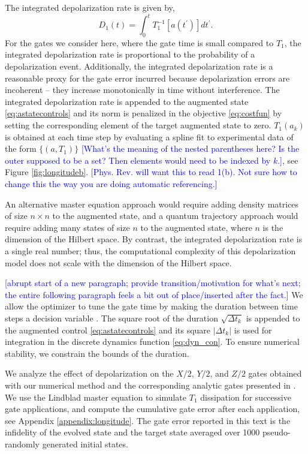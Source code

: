 The integrated depolarization rate is given by,
\begin{equation}
  D_{1}(t) = \int_{0}^{t} T_{1}^{-1}[a(t^{\prime})] dt^{\prime}.
\end{equation}
For the gates we consider here, where the gate time is small compared to $T_{1}$,
the integrated depolarization rate is proportional to the probability of a depolarization event.
Additionally, the integrated depolarization rate is a reasonable proxy for the gate error incurred
because depolarization errors are incoherent -- they increase monotonically in time without interference.
The integrated depolarization rate is appended to the augmented state \eqref{eq:astatecontrols}
and its norm is penalized in the objective \eqref{eq:costfun} by setting
the corresponding element of the target augmented state to zero.
$T_{1}(a_{k})$ is obtained at each time step by evaluating
a spline fit to experimental data of the form $\{(a, T_{1})\}$ \textcolor{blue}{[What's the meaning of the nested parentheses here? Is the outer supposed to be a set? Then elements would need to be indexed by $k$.]},
see Figure \ref{fig:longitudeb}. \textcolor{blue}{[Phys. Rev. will want this to read 1(b). Not sure how to change this the way you are doing automatic referencing.]}

An alternative master equation approach would require adding
density matrices of size $n \times n$
to the augmented state, and a quantum trajectory approach
would require adding many states of size $n$ to the augmented state,
where $n$ is the dimension of the Hilbert space.
By contrast, the integrated depolarization rate is a single
real number; thus, the computational complexity of this
depolarization model does not scale
with the dimension of the Hilbert space.

\textcolor{blue}{[abrupt start of a new paragraph; provide transition/motivation for what's next; the entire following paragraph feels a bit out of place/inserted after the fact.]}
We allow the optimizer to tune the gate time by
making the duration between time steps
a decision variable \cite{howell2019altro}. 
The square root of the duration $\sqrt{\Delta t_{k}}$
is appended to the augmented control \eqref{eq:astatecontrols}
and its square $\lvert \Delta t_{k} \rvert$ is used
for integration in the discrete dynamics function \eqref{eq:dyn_con}.
To ensure numerical stability, we constrain
the bounds of the duration.

We analyze the effect of depolarization on
the $X/2$, $Y/2$, and $Z/2$ gates obtained with
our numerical method and the corresponding analytic gates presented in \cite{zhang2020universal}.
We use the Lindblad master equation to simulate $T_{1}$ dissipation for successive
gate applications, and compute the cumulative gate error
after each application, see Appendix \ref{appendix:longitude}.
The gate error reported in this text is the infidelity
of the evolved state and the target state averaged over 1000 pseudo-randomly
generated initial states.


